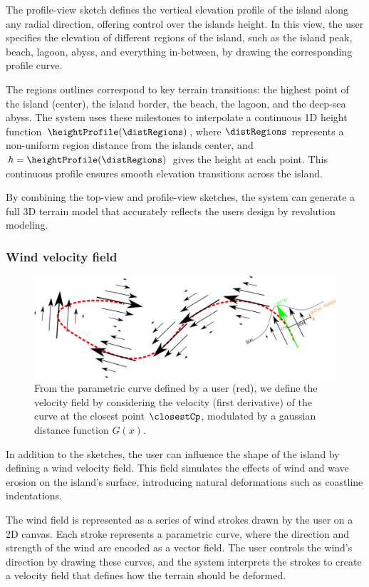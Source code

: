 The profile-view sketch defines the vertical elevation profile of the island along any radial direction, offering control over the islands height. In this view, the user specifies the elevation of different regions of the island, such as the island peak, beach, lagoon, abyss, and everything in-between, by drawing the corresponding profile curve.

The regions outlines correspond to key terrain transitions: the highest point of the island (center), the island border, the beach, the lagoon, and the deep-sea abyss. The system uses these milestones to interpolate a continuous 1D height function $\heightProfile(\distRegions)$, where $\distRegions$ represents a non-uniform region distance from the islands center, and $h = \heightProfile(\distRegions)$ gives the height at each point. This continuous profile ensures smooth elevation transitions across the island.

By combining the top-view and profile-view sketches, the system can generate a full 3D terrain model that accurately reflects the users design by revolution modeling.

\subsubsection{Wind velocity field}

\begin{figure}[ht]
    \centering
    \includegraphics[width = 0.8 \linewidth]{windByStrokes.pdf}
    \caption{From the parametric curve defined by a user (red), we define the velocity field by considering the velocity (first derivative) of the curve at the closest point $\closestCp$, modulated by a gaussian distance function $G(x)$. }
    \label{fig:coral-island_wind-from-strokes}
\end{figure}

In addition to the sketches, the user can influence the shape of the island by defining a wind velocity field. This field simulates the effects of wind and wave erosion on the island's surface, introducing natural deformations such as coastline indentations.

The wind field is represented as a series of wind strokes drawn by the user on a 2D canvas. Each stroke represents a parametric curve, where the direction and strength of the wind are encoded as a vector field. The user controls the wind's direction by drawing these curves, and the system interprets the strokes to create a velocity field that defines how the terrain should be deformed.

